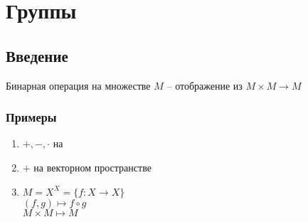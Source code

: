 \documentclass[main]{subfiles}
\begin{document}
\chapter{Группы}
\section{Введение}
\begin{definition}
    Бинарная операция на множестве $M$ -- отображение из $M \times M \to M$
\end{definition}

\subsection{Примеры}
\begin{enumerate}
    \item $+, -, \cdot$ на \Z
    \item $+$ на векторном пространстве
    \item $M= X^X = \{f: X \to X\}$\\
          $(f,g) \mapsto f\circ g$\\
          $M \times M \mapsto M$
\end{enumerate}
\end{document}
